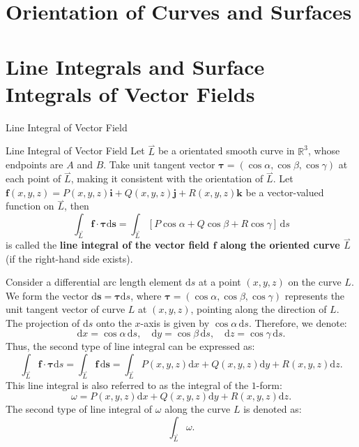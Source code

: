 \documentclass[11pt]{../../TexTemplate/elegantbook}
\begin{document}
\section{Orientation of Curves and Surfaces}

\section{Line Integrals and Surface Integrals of Vector Fields}
\begin{leftbarTitle}{Line Integral of Vector Field}\end{leftbarTitle}
\begin{definition}{Line Integral of Vector Field}
    Let \(\overset{\rightharpoonup}{L}\) be a orientated smooth curve in \(\mathbb{R}^3\),
    whose endpoints are \(A\) and \(B\).
    Take unit tangent vector \(\boldsymbol{\tau}=(\cos\alpha, \cos\beta, \cos\gamma)\) 
    at each point of \(\overset{\rightharpoonup}{L}\), making it consistent with the orientation of \(\overset{\rightharpoonup}{L}\).
    Let \(\mathbf{f}(x, y, z) = P(x, y, z)\mathbf{i} + Q(x, y, z)\mathbf{j} + R(x, y, z)\mathbf{k}\) 
    be a vector-valued function on \(\overset{\rightharpoonup}{L}\), then 
    \[
    \int_{\overset{\rightharpoonup}{L}} \mathbf{f} \cdot \boldsymbol{\tau} \mathrm{d}\mathbf{s} =
    \int_{\overset{\rightharpoonup}{L}} \left[P \cos\alpha + Q \cos\beta + R \cos\gamma\right] \, \mathrm{d}s
    \]
    is called the \textbf{line integral of the vector field \(\mathbf{f}\) along the oriented curve \(\overset{\rightharpoonup}{L}\)}
    (if the right-hand side exists).
\end{definition}
Consider a differential arc length element \( \mathrm{d}s \) at a point \((x, y, z)\) on the curve \( L \). 
We form the vector \( \mathrm{d}\mathbf{s} = \boldsymbol{\tau} \mathrm{d}s \), 
where \( \boldsymbol{\tau} = (\cos\alpha, \cos\beta, \cos\gamma) \) represents 
the unit tangent vector of curve \( L \) at \((x, y, z)\), pointing along the direction of \( L \). 
The projection of \( \mathrm{d}s \) onto the \( x \)-axis is given by \(\cos\alpha \, \mathrm{d}s\). 
Therefore, we denote:
\[
\mathrm{d}x = \cos\alpha \, \mathrm{d}s, \quad \mathrm{d}y = \cos\beta \, \mathrm{d}s, \quad 
\mathrm{d}z = \cos\gamma \, \mathrm{d}s.
\]
Thus, the second type of line integral can be expressed as:
\[
\int_{\overset{\rightharpoonup}{L}} \mathbf{f} \cdot \boldsymbol{\tau} \mathrm{d}s = \int_{\overset{\rightharpoonup}{L}} \mathbf{f} \, \mathrm{d} \mathbf{s} 
= \int_{\overset{\rightharpoonup}{L}} P(x, y, z) \mathrm{d}x + Q(x, y, z) \mathrm{d}y + R(x, y, z) \mathrm{d}z.
\]
This line integral is also referred to as the integral of the \(1\)-form:
\[
\omega = P(x, y, z) \mathrm{d}x + Q(x, y, z) \mathrm{d}y + R(x, y, z) \mathrm{d}z.
\]
The second type of line integral of \( \omega \) along the curve \( L \) is denoted as:
\[
\int_{\overset{\rightharpoonup}{L}} \omega.
\]
\end{document}
